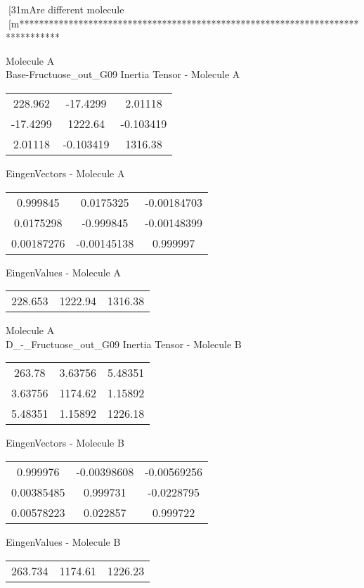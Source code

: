 [31mAre different molecule
[m********************************************************************************
\newpage
\begin{multicols}{2}
\begin{center}
Molecule A \\ 
Base-Fructuose_out_G09
Inertia Tensor - Molecule A \\
\vtab
\begin{tabular}{|c c c|}
228.962	 & 	-17.4299	 & 	2.01118	 \\
-17.4299	 & 	1222.64	 & 	-0.103419	 \\
2.01118	 & 	-0.103419	 & 	1316.38
\end{tabular}

\vtab
 EingenVectors - Molecule A     \\
\vtab
\begin{tabular}{|c c c|}
0.999845	 & 	0.0175325	 & 	-0.00184703	 \\
0.0175298	 & 	-0.999845	 & 	-0.00148399	 \\
0.00187276	 & 	-0.00145138	 & 	0.999997
\end{tabular}

\vtab
 EingenValues - Molecule A     \\
\vtab
\begin{tabular}{|c c c|}
228.653	 & 	1222.94	 & 	1316.38
\end{tabular}
\columnbreak
Molecule A \\ 
D_-_Fructuose_out_G09
Inertia Tensor - Molecule B \\
\vtab
\begin{tabular}{|c c c|}
263.78	 & 	3.63756	 & 	5.48351	 \\
3.63756	 & 	1174.62	 & 	1.15892	 \\
5.48351	 & 	1.15892	 & 	1226.18
\end{tabular}

\vtab
 EingenVectors - Molecule B     \\
\vtab
\begin{tabular}{|c c c|}
0.999976	 & 	-0.00398608	 & 	-0.00569256	 \\
0.00385485	 & 	0.999731	 & 	-0.0228795	 \\
0.00578223	 & 	0.022857	 & 	0.999722
\end{tabular}

\vtab
 EingenValues - Molecule B     \\
\vtab
\begin{tabular}{|c c c|}
263.734	 & 	1174.61	 & 	1226.23
\end{tabular}
\end{center}
\end{multicols}
